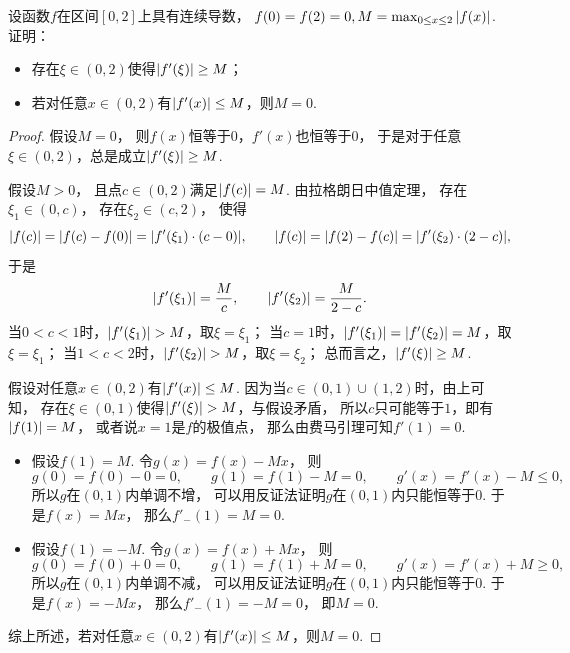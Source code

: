 \begin{example}
设函数\(f\)在区间\([0,2]\)上具有连续导数，
\(f(0) = f(2) = 0,
M = \max_{0 \leq x \leq 2} \abs{f(x)}\).
证明：\begin{itemize}
	\item 存在\(\xi\in(0,2)\)使得\(\abs{f'(\xi)} \geq M\)；
	\item 若对任意\(x\in(0,2)\)有\(\abs{f'(x)} \leq M\)，则\(M = 0\).
\end{itemize}
\begin{proof}
假设\(M = 0\)，
则\(f(x)\)恒等于\(0\)，\(f'(x)\)也恒等于\(0\)，
于是对于任意\(\xi\in(0,2)\)，总是成立\(\abs{f'(\xi)} \geq M\).

假设\(M > 0\)，
且点\(c\in(0,2)\)满足\(\abs{f(c)} = M\).
由拉格朗日中值定理，
存在\(\xi_1\in(0,c)\)，
存在\(\xi_2\in(c,2)\)，
使得\begin{equation*}
	\abs{f(c)}
	= \abs{f(c) - f(0)}
	= \abs{f'(\xi_1) \cdot (c - 0)},
	\qquad
	\abs{f(c)}
	= \abs{f(2) - f(c)}
	= \abs{f'(\xi_2) \cdot (2 - c)},
\end{equation*}
于是\begin{equation*}
	\abs{f'(\xi_1)} = \frac{M}{c},
	\qquad
	\abs{f'(\xi_2)} = \frac{M}{2-c}.
\end{equation*}
当\(0<c<1\)时，\(\abs{f'(\xi_1)} > M\)，取\(\xi=\xi_1\)；
当\(c=1\)时，\(\abs{f'(\xi_1)} = \abs{f'(\xi_2)} = M\)，取\(\xi=\xi_1\)；
当\(1<c<2\)时，\(\abs{f'(\xi_2)} > M\)，取\(\xi=\xi_2\)；
总而言之，\(\abs{f'(\xi)} \geq M\).

假设对任意\(x\in(0,2)\)有\(\abs{f'(x)} \leq M\).
因为当\(c\in(0,1)\cup(1,2)\)时，由上可知，
存在\(\xi\in(0,1)\)使得\(\abs{f'(\xi)} > M\)，与假设矛盾，
所以\(c\)只可能等于\(1\)，即有\(\abs{f(1)} = M\)，
或者说\(x=1\)是\(f\)的极值点，
那么由费马引理可知\(f'(1) = 0\).
\begin{itemize}
	\item 假设\(f(1) = M\).
	令\(g(x) = f(x) - M x\)，
	则\begin{equation*}
		g(0) = f(0) - 0 = 0,
		\qquad
		g(1) = f(1) - M = 0,
		\qquad
		g'(x) = f'(x) - M \leq 0,
	\end{equation*}
	所以\(g\)在\((0,1)\)内单调不增，
	可以用反证法证明\(g\)在\((0,1)\)内只能恒等于\(0\).
	于是\(f(x) = M x\)，
	那么\(f'_-(1) = M = 0\).

	\item 假设\(f(1) = -M\).
	令\(g(x) = f(x) + M x\)，
	则\begin{equation*}
		g(0) = f(0) + 0 = 0,
		\qquad
		g(1) = f(1) + M = 0,
		\qquad
		g'(x) = f'(x) + M \geq 0,
	\end{equation*}
	所以\(g\)在\((0,1)\)内单调不减，
	可以用反证法证明\(g\)在\((0,1)\)内只能恒等于\(0\).
	于是\(f(x) = -M x\)，
	那么\(f'_-(1) = -M = 0\)，
	即\(M = 0\).
\end{itemize}
综上所述，若对任意\(x\in(0,2)\)有\(\abs{f'(x)} \leq M\)，则\(M = 0\).
\end{proof}
\end{example}

